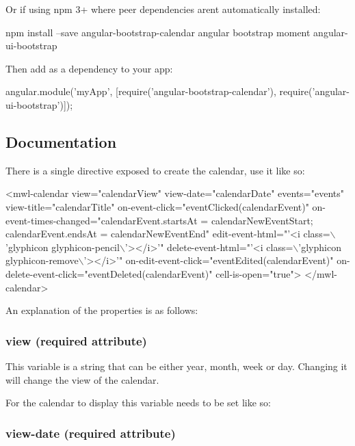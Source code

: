 Or if using npm 3+ where peer dependencies aren\textquotesingle{}t automatically installed\+: 
\begin{DoxyCode}
npm install --save angular-bootstrap-calendar angular bootstrap moment angular-ui-bootstrap
\end{DoxyCode}


Then add as a dependency to your app\+:


\begin{DoxyCode}
angular.module('myApp', [require('angular-bootstrap-calendar'), require('angular-ui-bootstrap')]);
\end{DoxyCode}


\subsection*{Documentation}

There is a single directive exposed to create the calendar, use it like so\+: 
\begin{DoxyCode}
<mwl-calendar
    view="calendarView"
    view-date="calendarDate"
    events="events"
    view-title="calendarTitle"
    on-event-click="eventClicked(calendarEvent)"
    on-event-times-changed="calendarEvent.startsAt = calendarNewEventStart; calendarEvent.endsAt =
       calendarNewEventEnd"
    edit-event-html="'<i class=\(\backslash\)'glyphicon glyphicon-pencil\(\backslash\)'></i>'"
    delete-event-html="'<i class=\(\backslash\)'glyphicon glyphicon-remove\(\backslash\)'></i>'"
    on-edit-event-click="eventEdited(calendarEvent)"
    on-delete-event-click="eventDeleted(calendarEvent)"
    cell-is-open="true">
</mwl-calendar>
\end{DoxyCode}


An explanation of the properties is as follows\+:

\subsubsection*{view (required attribute)}

This variable is a string that can be either {\ttfamily year}, {\ttfamily month}, {\ttfamily week} or {\ttfamily day}. Changing it will change the view of the calendar.

For the calendar to display this variable needs to be set like so\+: 


\subsubsection*{view-\/date (required attribute)}

